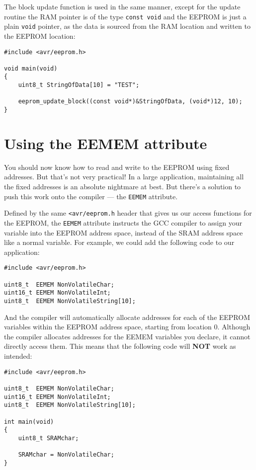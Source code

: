 \documentclass[a4paper,oneside,notitlepage]{book}
\begin{document}
The block update function is used in the same manner, except for the update routine the RAM pointer is of the type \lstinline{const void} and the EEPROM is just a plain \lstinline{void} pointer, as the data is sourced from the RAM location and written to the EEPROM location:

\begin{center}
\begin{lstlisting}
#include <avr/eeprom.h>

void main(void)
{
    uint8_t StringOfData[10] = "TEST";

    eeprom_update_block((const void*)&StringOfData, (void*)12, 10);
}
\end{lstlisting}
\end{center}


\chapter{Using the EEMEM attribute}

You should now know how to read and write to the EEPROM using fixed addresses. But that's not very practical! In a large application, maintaining all the fixed addresses is an absolute nightmare at best. But there's a solution to push this work onto the compiler --- the \lstinline{EEMEM} attribute.

Defined by the same \lstinline{<avr/eeprom.h} header that gives us our access functions for the EEPROM, the \lstinline{EEMEM} attribute instructs the GCC compiler to assign your variable into the EEPROM address space, instead of the SRAM address space like a normal variable. For example, we could add the following code to our application:

\begin{center}
\begin{lstlisting}
#include <avr/eeprom.h>

uint8_t  EEMEM NonVolatileChar;
uint16_t EEMEM NonVolatileInt;
uint8_t  EEMEM NonVolatileString[10];
\end{lstlisting}
\end{center}

And the compiler will automatically allocate addresses for each of the EEPROM variables within the EEPROM address space, starting from location 0. Although the compiler allocates addresses for the EEMEM variables you declare, it cannot directly access them. This means that the following code will \textbf{NOT} work as intended:

\begin{center}
\begin{lstlisting}
#include <avr/eeprom.h>

uint8_t  EEMEM NonVolatileChar;
uint16_t EEMEM NonVolatileInt;
uint8_t  EEMEM NonVolatileString[10];

int main(void)
{
    uint8_t SRAMchar;

    SRAMchar = NonVolatileChar;
}
\end{lstlisting}
\end{center}
\end{document}
